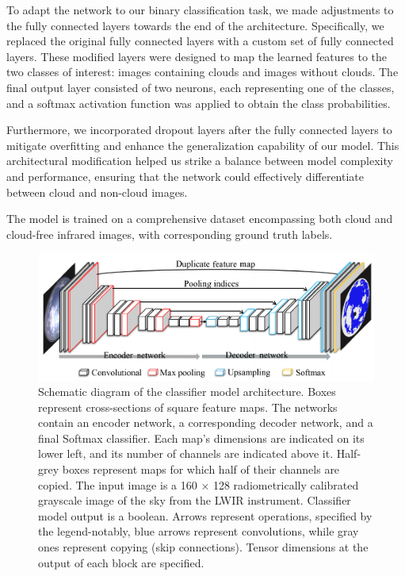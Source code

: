 \documentclass[amt, article]{copernicus}
\begin{document}
To adapt the network to our binary classification task, we made adjustments to the fully connected layers towards the end of the architecture. Specifically, we replaced the original fully connected layers with a custom set of fully connected layers. These modified layers were designed to map the learned features to the two classes of interest: images containing clouds and images without clouds. The final output layer consisted of two neurons, each representing one of the classes, and a softmax activation function was applied to obtain the class probabilities.

Furthermore, we incorporated dropout layers after the fully connected layers to mitigate overfitting and enhance the generalization capability of our model. This architectural modification helped us strike a balance between model complexity and performance, ensuring that the network could effectively differentiate between cloud and non-cloud images.

The model is trained on a comprehensive dataset encompassing both cloud and cloud-free infrared images, with corresponding ground truth labels.

\begin{figure}[t]
	\includegraphics[width=\hsize]{figures/schematics_segmentation_model.png}
	\caption{
		Schematic diagram of the classifier model architecture. Boxes represent cross-sections of square feature maps.  The networks contain an encoder network, a corresponding decoder network, and a final Softmax classifier. Each map's dimensions are indicated on its lower left, and its number of channels are indicated above it. Half-grey boxes represent maps for which half of their channels are copied. The input image is a 160 × 128 radiometrically calibrated grayscale image of the sky from the LWIR instrument. Classifier model output is a boolean. Arrows represent operations, specified by the legend-notably, blue arrows represent convolutions, while gray ones represent copying (skip connections). Tensor dimensions at the output of each block are specified.}
        \label{fig:schematics_classification_model}
\end{figure}
\end{document}
